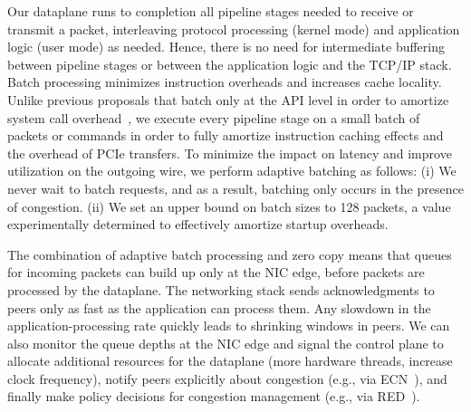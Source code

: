 

 Our dataplane
runs to completion all pipeline stages needed to receive or transmit a
packet, interleaving protocol processing (kernel mode) and application
logic (user mode) as needed. Hence, there is no need for intermediate
buffering between pipeline stages or between the application logic and
the TCP/IP stack. Batch processing minimizes instruction overheads and
increases cache locality.  Unlike previous proposals that batch only
at the API level in order to amortize system call
overhead~\cite{jeong2014mtcp,han2012megapipe}, we execute every
pipeline stage on a small batch of packets or commands in order to
fully amortize instruction caching effects and the overhead of PCIe
transfers. To minimize the impact on latency and improve utilization on
the outgoing wire, we perform adaptive batching as follows: (i) We
never wait to batch requests, and as a result, batching only occurs
in the presence of congestion. (ii) We set an upper bound on batch
sizes to 128 packets, a value experimentally determined to effectively
amortize startup overheads.

The combination of adaptive batch processing and zero copy means that
queues for incoming packets can build up only at the NIC edge, before
packets are processed by the dataplane.  The networking stack sends
acknowledgments to peers only as fast as the application can process
them. Any slowdown in the application-processing rate quickly leads to
shrinking windows in peers. We can also monitor the queue
depths at the NIC edge and signal the control plane to allocate
additional resources for the dataplane (more hardware threads,
increase clock frequency), notify peers explicitly about congestion
(e.g., via ECN~\cite{ramakrishnan2001addition}), and finally make
policy decisions for congestion management (e.g., via
RED~\cite{DBLP:journals/ton/FloydJ93}).


